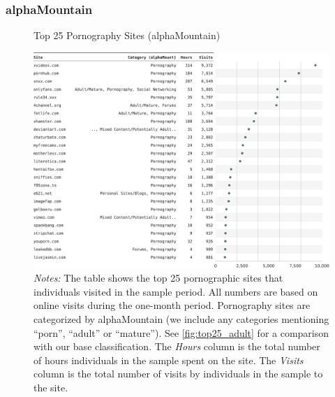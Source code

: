 \documentclass[12pt,twoside]{article}
\begin{document}
\subsubsection{alphaMountain}
\begin{figure}[!ht]
	\centering
	\caption{Top 25 Pornography Sites (alphaMountain)}
	\includegraphics[width=\textwidth]{figs/top_25_adultsites_alphamountain.pdf}
	\caption*{\footnotesize \emph{Notes:} 
		The table shows the top 25 pornographic sites that individuals visited in the sample period.
            All numbers are based on online visits during the one-month period.
		Pornography sites are categorized by alphaMountain (we include any categories mentioning ``porn'', ``adult'' or ``mature'').
            See \cref{fig:top25_adult} for a comparison with our base classification.
    	The \emph{Hours} column is the total number of hours individuals in the sample spent on the site. 
    	The \emph{Visits} column is the total number of visits by individuals in the sample to the site.            
	}
	\label{fig:top25_adult_alphamountain}
\end{figure}




\end{document}
